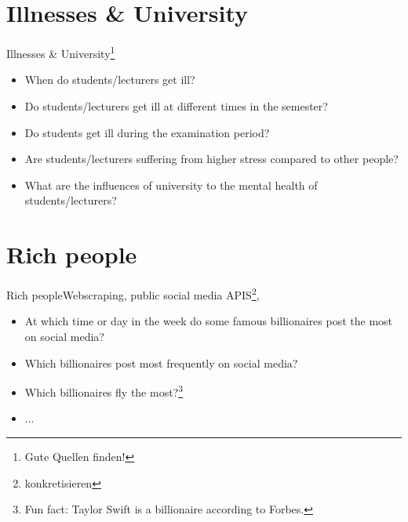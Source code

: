     \section{Illnesses \& University}
    \begin{frame}{Illnesses \& University}{\footnote{Gute Quellen finden!}}
        \begin{itemize}[<+->]
            \item When do students/lecturers get ill?
            \item Do students/lecturers get ill at different times in the semester?
            \item Do students get ill during the examination period?
            \item Are students/lecturers suffering from higher stress compared to other people?
            \item What are the influences of university to the mental health of students/lecturers?
        \end{itemize}
    \end{frame}

    \section{Rich people}
    \begin{frame}{Rich people}{Webscraping, public social media APIS\footnote{konkretisieren}, }
        \begin{itemize}[<+->]
            \item At which time or day in the week do some famous billionaires post the most on social media?
            \item Which billionaires post most frequently on social media?
            \item Which billionaires fly the most?\footnote{Fun fact: Taylor Swift is a billionaire according to Forbes.}
            \item ...
        \end{itemize}
    \end{frame}

